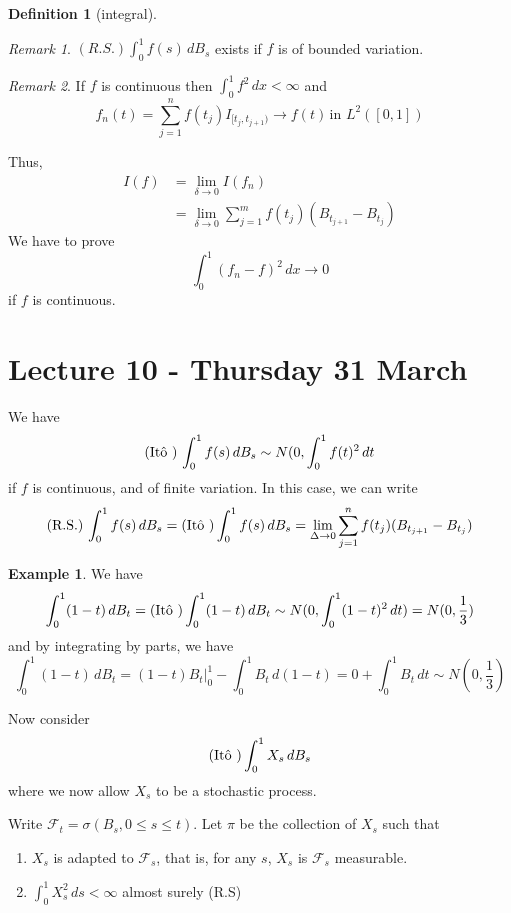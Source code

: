 \documentclass[10pt, oneside, reqno]{amsart}
\theoremstyle{plain}%
\theoremstyle{definition}
\newtheorem{defn}[thm]{Definition}
\newtheorem{exmp}[thm]{Example}
\theoremstyle{remark}
\newtheorem*{rem}{Remark}
\newcommand{\sigf}{\mathcal{F}}
\begin{document}
\begin{defn}[\ito integral]
    \begin{rem}
        $(R.S.) \int_0^1 f(s) \, dB_s$ exists if $f$ is of bounded variation.
    \end{rem}
    
    \begin{rem}
        If $f$ is continuous then $\int_0^1 f^2 \, dx < \infty$ and \[
            f_n(t) = \sum_{j=1}^n f(t_j) I_{[t_j, t_{j+1})} \rightarrow f(t) \, \text{in $L^2([0,1])$}
            \]
            
        Thus, \begin{align*}
            I(f)    &= \lim_{\delta \rightarrow 0} I(f_n) \\
                    &= \lim_{\delta \rightarrow 0} \sum_{j=1}^m f(t_j) (B_{t_{j+1}} - B_{t_j})
        \end{align*}
        We have to prove \[
            \int_0^1 (f_n - f)^2 \, dx \rightarrow 0
        \] if $f$ is continuous.
    \end{rem}
    
\end{defn}

\section{Lecture 10 - Thursday 31 March} %
\label{sec:lecture_10_thursday_31_march}
We have \[
    (\text{\text{It\^o\ }})\, \int_0^1 f(s) \, dB_s \sim N(0, \int_0^1 f(t)^2 \, dt
\] if $f$ is continuous, and of finite variation.  In this case, we can write \[
    (\text{R.S.}) \, \int_0^1 f(s) \, dB_s = (\text{\text{It\^o\ }}) \int_0^1 f(s) \, dB_s = \lim_{\Delta \rightarrow 0} \sum_{j=1}^n f(t_j) (B_{t_{j+1}} - B_{t_j})
\]

\begin{exmp}
    We have \[
        \int_0^1 (1-t) \, dB_t =  (\text{It\^o\ }) \int_0^1 (1-t) \, dB_t \sim N(0, \int_0^1 (1-t)^2 \, dt) = N(0, \frac{1}{3})
    \] and by integrating by parts, we have \[
        \int_0^1 (1-t) \, dB_t = (1-t) B_t |_0^1 - \int_0^1 B_t \, d(1-t) = 0 + \int_0^1 B_t \, dt \sim N(0, \frac{1}{3})
    \]
\end{exmp}

Now consider \[
    (\text{It\^o\ }) \int_0^1 X_s \, dB_s
\] where we now allow $X_s$ to be a stochastic process.

Write $\sigf_t = \sigma(B_s, 0 \leq s \leq t).$  Let $\pi$ be the collection of $X_s$ such that 
\begin{enumerate}[(1)]
    \item $X_s$ is adapted to $\sigf_s$, that is, for any $s$, $X_s$ is $\sigf_s$ measurable.  
    \item $\int_0^1 X_s^2 \, ds < \infty$ almost surely (R.S)
\end{enumerate} 
\end{document}
